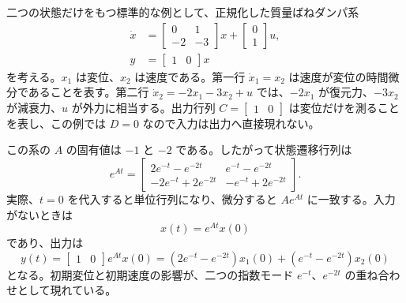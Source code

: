 二つの状態だけをもつ標準的な例として、正規化した質量ばねダンパ系
\begin{align}
  \dot{x}
  &=
  \begin{bmatrix}0&1\\-2&-3\end{bmatrix}x
  +
  \begin{bmatrix}0\\1\end{bmatrix}u,\\
  y&=\begin{bmatrix}1&0\end{bmatrix}x
\end{align}
を考える。$x_1$ は変位、$x_2$ は速度である。第一行 $\dot{x}_1=x_2$ は速度が変位の時間微分であることを表す。第二行 $\dot{x}_2=-2x_1-3x_2+u$ では、$-2x_1$ が復元力、$-3x_2$ が減衰力、$u$ が外力に相当する。出力行列 $C=\begin{bmatrix}1&0\end{bmatrix}$ は変位だけを測ることを表し、この例では $D=0$ なので入力は出力へ直接現れない。

この系の $A$ の固有値は $-1$ と $-2$ である。したがって状態遷移行列は
\begin{equation}
  e^{At}=
  \begin{bmatrix}
    2e^{-t}-e^{-2t}&e^{-t}-e^{-2t}\\
    -2e^{-t}+2e^{-2t}&-e^{-t}+2e^{-2t}
  \end{bmatrix}.
  \label{eq:two-state-transition}
\end{equation}
実際、$t=0$ を代入すると単位行列になり、微分すると $Ae^{At}$ に一致する。入力がないときは
\begin{equation}
  x(t)=e^{At}x(0)
\end{equation}
であり、出力は
\begin{equation}
  y(t)=
  \begin{bmatrix}1&0\end{bmatrix}e^{At}x(0)
  =(2e^{-t}-e^{-2t})x_1(0)+(e^{-t}-e^{-2t})x_2(0)
\end{equation}
となる。初期変位と初期速度の影響が、二つの指数モード $e^{-t}$、$e^{-2t}$ の重ね合わせとして現れている。

